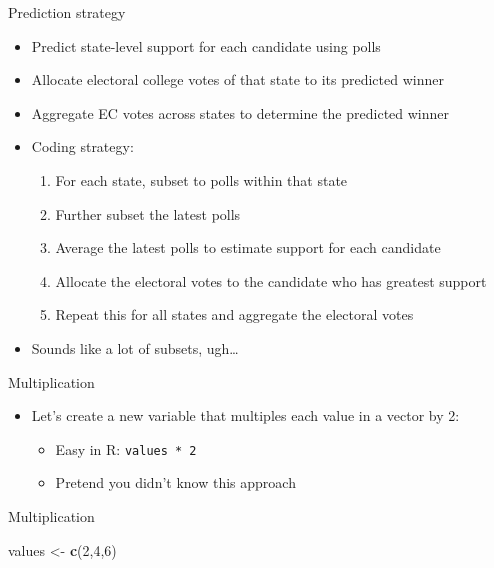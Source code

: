 \documentclass[
  ignorenonframetext,
]{beamer}
\newenvironment{Shaded}{\begin{snugshade}}{\end{snugshade}}
\newcommand{\DecValTok}[1]{\textcolor[rgb]{0.00,0.00,0.81}{#1}}
\newcommand{\FunctionTok}[1]{\textcolor[rgb]{0.13,0.29,0.53}{\textbf{#1}}}
\newcommand{\NormalTok}[1]{#1}
\newcommand{\OtherTok}[1]{\textcolor[rgb]{0.56,0.35,0.01}{#1}}
\providecommand{\tightlist}{%
  \setlength{\itemsep}{0pt}\setlength{\parskip}{0pt}}
\begin{document}
\begin{frame}{Prediction strategy}
\label{prediction-strategy}
\pause

\begin{itemize}
\item
  Predict state-level support for each candidate using polls \pause
\item
  Allocate electoral college votes of that state to its predicted winner
  \pause
\item
  Aggregate EC votes across states to determine the predicted winner
  \pause
\item
  Coding strategy: \pause

  \begin{enumerate}
  \tightlist
  \item
    For each state, subset to polls within that state \pause
  \item
    Further subset the latest polls \pause
  \item
    Average the latest polls to estimate support for each candidate
    \pause
  \item
    Allocate the electoral votes to the candidate who has greatest
    support \pause
  \item
    Repeat this for all states and aggregate the electoral votes \pause 
  \end{enumerate}
\item
  Sounds like a lot of subsets, ugh\ldots{}
\end{itemize}
\end{frame}

\begin{frame}[fragile,t]{Multiplication}
\label{multiplication}
\pause

\begin{itemize}
\tightlist
\item
  Let's create a new variable that multiples each value in a vector by
  2: \pause

  \begin{itemize}
  \tightlist
  \item
    Easy in R: \texttt{values\ *\ 2} \pause
  \item
    Pretend you didn't know this approach
  \end{itemize}
\end{itemize}
\end{frame}

\begin{frame}[fragile,t]{Multiplication}
\label{multiplication-1}
\footnotesize

\begin{Shaded}
\begin{Highlighting}[]
\NormalTok{values }\OtherTok{\textless{}{-}} \FunctionTok{c}\NormalTok{(}\DecValTok{2}\NormalTok{,}\DecValTok{4}\NormalTok{,}\DecValTok{6}\NormalTok{)}
\end{Highlighting}
\end{Shaded}
\end{frame}
\end{document}
